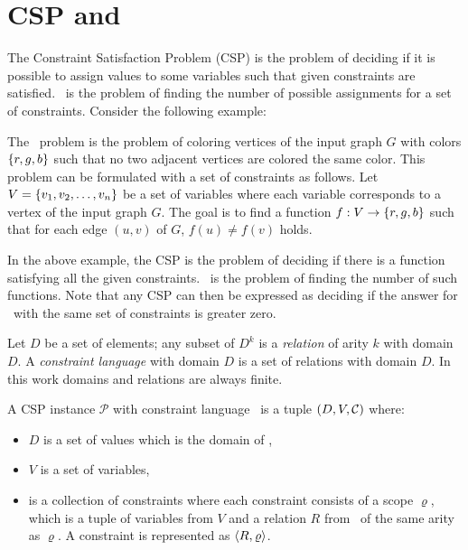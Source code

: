 \chapter{CSP and \ccsp} 
The Constraint Satisfaction Problem (CSP) is the problem of deciding if it is possible to
assign values to some variables such that given constraints are satisfied. \ccsp\ 
is the problem of finding the number of possible assignments for a set of constraints.
Consider the following example:

\begin{example}[\tcoloring]\label{exm:3col}
The \tcoloring\ problem is the problem of coloring vertices of the input graph \(G\)
with colors \(\{{r,g,b}\}\) such that no two adjacent vertices are colored the same color.
This problem can be formulated with a set of constraints as follows.
Let \(V=\{{v_1,v_2,\dotsc,v_n}\}\)
be a set of variables where each variable corresponds to a vertex of
the input graph \(G\)\@. The goal is to find a function
\(f:V\to \{{r,g,b}\}\) such that for each edge \((u,v)\) of \(G\), \(f(u)\neq f(v)\) holds.
\end{example}

In the above example,
the CSP is the problem of deciding
if there is a function satisfying all the given constraints. \ccsp\ is the
problem of finding the number of such functions. Note that any CSP can then be expressed as 
deciding if the answer for \ccsp\ with the same set of constraints is greater zero.


Let \(D\) be a set of elements; any subset of \(D^k\) is a \emph{relation} of arity \(k\) with
domain \(D\)\@. A \emph{constraint language} with domain \(D\) is a set of
relations with domain \(D\)\@.
In this work domains and relations are always finite.

A CSP instance \(\mathcal{P}\) with constraint language \mrelset\ is a tuple 
\((D,V,\mathcal{C})\) where:
\begin{itemize}
\item \(D\) is a set of values which is the domain of \mrelset,
\item \(V\) is a set of variables,
\item \mconset is a collection of constraints where each constraint consists of a scope \(\varrho\),
which is a tuple of variables from \(V\) and a relation \(R\) from \mrelset\
of the same arity as \(\varrho\)\@. A constraint is represented as \(\langle R, \varrho \rangle\)\@.
\end{itemize}

